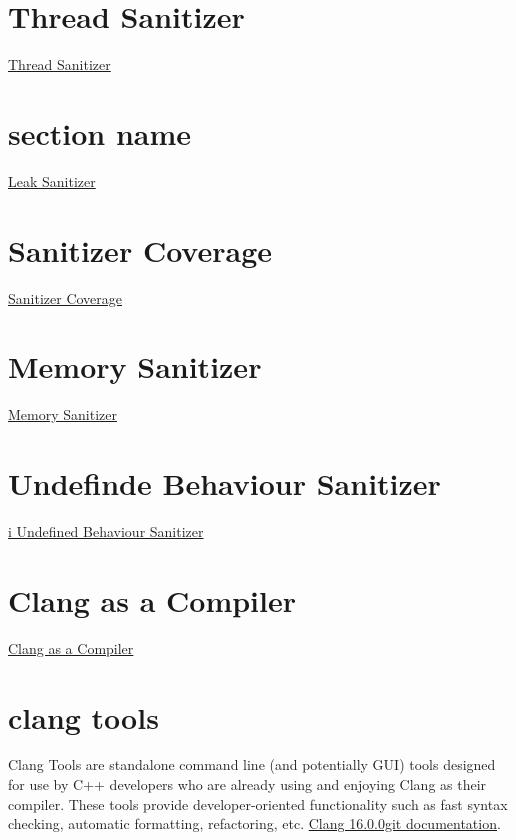 \section{Thread Sanitizer}%
\label{sec:thread_sanitizer}
\href{https://clang.llvm.org/docs/ThreadSanitizer.html}{Thread Sanitizer}

\section{section name}%
\label{sec:section_name}
\href{https://clang.llvm.org/docs/LeakSanitizer.html}{Leak Sanitizer}


\section{Sanitizer Coverage}%
\label{sec:sanitizer_coverage}
\href{https://clang.llvm.org/docs/SanitizerCoverage.html}{Sanitizer Coverage}

\section{Memory Sanitizer}%
\label{sec:memory_sanitizer}
\href{https://clang.llvm.org/docs/MemorySanitizer.html}{Memory Sanitizer}

\section{Undefinde Behaviour Sanitizer}%
\label{sec:undefinde_behaviour_sanitizer}
\href{https://clang.llvm.org/docs/UndefinedBehaviorSanitizer.html}{i Undefined Behaviour Sanitizer}















\section{Clang as a Compiler}%
\label{sec:clang_as_a_compiler}
\href{https://clang.llvm.org/docs/index.html} {Clang as a Compiler}


\section{clang tools}
Clang Tools are standalone command line (and potentially GUI) tools designed for use by C++ developers who are already using and enjoying Clang as their compiler. These tools provide developer-oriented functionality such as fast syntax checking, automatic formatting, refactoring, etc. \href{https://clang.llvm.org/docs/ClangTools.html}{Clang 16.0.0git documentation}.


